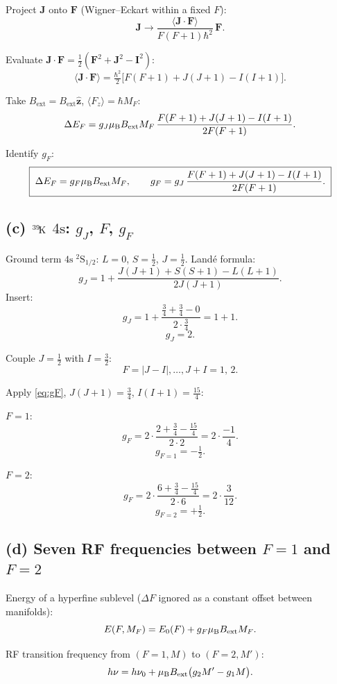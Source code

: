 \documentclass[11pt]{article}
\newcommand{\Bext}{B_{\mathrm{ext}}}
\begin{document}
Project $\bm J$ onto $\bm F$ (Wigner--Eckart within a fixed $F$):
\[
\bm J\to\frac{\langle\bm J\!\cdot\!\bm F\rangle}{F(F+1)\hbar^{2}}\,\bm F.
\]

Evaluate $\bm J\!\cdot\!\bm F=\tfrac12(\bm F^{2}+\bm J^{2}-\bm I^{2})$:
\[
\langle\bm J\!\cdot\!\bm F\rangle=\tfrac{\hbar^{2}}{2}\bigl[F(F+1)+J(J+1)-I(I+1)\bigr].
\]

Take $\Bext=\Bext\hat{\bm z}$, $\langle F_{z}\rangle=\hbar M_{F}$:
\[
\Delta E_{F}=g_{J}\mu_{\rm B}\Bext M_{F}\,\frac{F(F+1)+J(J+1)-I(I+1)}{2F(F+1)}.
\]

Identify $g_{F}$:
\begin{equation}
\boxed{\;\Delta E_{F}=g_{F}\mu_{\rm B}\Bext M_{F},\qquad g_{F}=g_{J}\,\frac{F(F+1)+J(J+1)-I(I+1)}{2F(F+1)}.\;}
\label{eq:gF}
\end{equation}

\subsection*{(c) ${}^{39}\!{\rm K}$ $4\mathrm{s}$: $g_{J}$, $F$, $g_{F}$}

Ground term $4\mathrm{s}\;{}^{2}\!\mathrm{S}_{1/2}$: $L=0$, $S=\tfrac12$, $J=\tfrac12$. Land\'e formula:
\[
g_{J}=1+\frac{J(J+1)+S(S+1)-L(L+1)}{2J(J+1)}.
\]
Insert:
\[
g_{J}=1+\frac{\tfrac34+\tfrac34-0}{2\cdot\tfrac34}=1+1.
\]
\[
\boxed{\;g_{J}=2.\;}
\]

Couple $J=\tfrac12$ with $I=\tfrac32$:
\[
F=|J-I|,\dots,J+I=1,\,2.
\]

Apply \eqref{eq:gF}, $J(J+1)=\tfrac34$, $I(I+1)=\tfrac{15}{4}$:

$F=1$:
\[
g_{F}=2\cdot\frac{2+\tfrac34-\tfrac{15}{4}}{2\cdot 2}=2\cdot\frac{-1}{4}.
\]
\[
\boxed{\;g_{F=1}=-\tfrac12.\;}
\]

$F=2$:
\[
g_{F}=2\cdot\frac{6+\tfrac34-\tfrac{15}{4}}{2\cdot 6}=2\cdot\frac{3}{12}.
\]
\[
\boxed{\;g_{F=2}=+\tfrac12.\;}
\]

\subsection*{(d) Seven RF frequencies between $F=1$ and $F=2$}

Energy of a hyperfine sublevel ($\Delta F$ ignored as a constant offset between manifolds):
\[
E(F,M_{F})=E_{0}(F)+g_{F}\mu_{\rm B}\Bext M_{F}.
\]

RF transition frequency from $(F=1,M)$ to $(F=2,M')$:
\[
h\nu=h\nu_{0}+\mu_{\rm B}\Bext\bigl(g_{2}M'-g_{1}M\bigr).
\]
\end{document}
